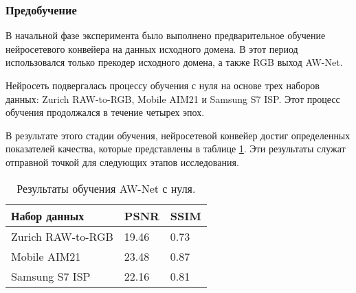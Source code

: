 \subsubsection{Предобучение}

В начальной фазе эксперимента было выполнено предварительное обучение нейросетевого конвейера на данных исходного домена. В этот период использовался только прекодер исходного домена, а также RGB выход AW-Net.

Нейросеть подвергалась процессу обучения с нуля на основе трех наборов данных: Zurich RAW-to-RGB, Mobile AIM21 и Samsung S7 ISP. Этот процесс обучения продолжался в течение четырех эпох.

В результате этого стадии обучения, нейросетевой конвейер достиг определенных показателей качества, которые представлены в таблице \ref{tab:from-zoro}. Эти результаты служат отправной точкой для следующих этапов исследования.

\begin{table}[H]
    \caption{Результаты обучения AW-Net с нуля.}\label{tab:from-zoro}
    \begin{tabular}{|p{5cm}|p{3cm}|p{3cm}|}
        \hline
        {Набор данных} & {PSNR} & {SSIM} \\
        \hline
        Zurich RAW-to-RGB & 19.46 & 0.73 \\
        \hline
        Mobile AIM21 & 23.48 & 0.87 \\
        \hline
        Samsung S7 ISP & 22.16 & 0.81 \\
        \hline
    \end{tabular}
\end{table}